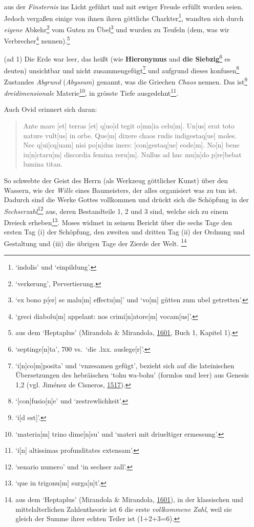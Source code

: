 \documentclass[
]{article}
\begin{document}
aus der \emph{Finsternis} ins Licht geführt und mit ewiger Freude
erfüllt worden seien. Jedoch vergaßen einige von ihnen ihren göttliche
Charkter\footnote{`indolis' und `einpildung'.}, wandten sich durch
\emph{eigene} Abkehr\footnote{`verkerung', Pervertierung.} vom Guten zu
Übel\footnote{`ex bono p{[}er{]} se malu{[}m{]} effectu{[}m{]}' und
  `vo{[}m{]} gůtten zum ubel getretten'.} und wurden zu Teufeln (dem, was wir
Verbrecher\footnote{`greci diabolu{[}m{]} appelant: nos
  crimi{[}n{]}atore{[}m{]} vocam{[}us{]}'.} nennen).\footnote{aus dem
  `Heptaplus' (Mirandola \& Mirandola,
  \href{https://doi.org/10.3931/e-rara-61217}{1601}, Buch 1, Kapitel 1).}

(ad 1) Die Erde war leer, das heißt (wie \textbf{Hieronymus} und
\textbf{die Siebzig}\footnote{`septinge{[}n{]}ta', 700 vs.~`die .lxx.
  auslege{[}r{]}'.} es deuten) unsichtbar und nicht
zusammengefügt\footnote{`i{[}n{]}co{[}m{]}posita' und `vnzesamen
  gefügt', bezieht sich auf die lateinischen Übersetzungen des
  hebräischen `tohu wa-bohu' (formlos und leer) aus Genesis 1,2 (vgl.
  Jiménez de Cisneros,
  \href{https://doi.org/10.3931/e-rara-46695}{1517}).} und aufgrund
dieses konfusen\footnote{`{[}con{]}fusio{[}n{]}e' und `zestrewlichkeit'.}
Zustandes \emph{Abgrund} (\emph{Abyssum}) genannt, was die Griechen
\emph{Chaos} nennen. Das ist\footnote{`i{[}d est{]}'.}
\emph{dreidimensionale} Materie\footnote{`materia{[}m{]} trino
  dime{[}n{]}su' und `materi mit driueltiger ermessung'.}, in grösste
Tiefe ausgedehnt\footnote{`i{[}n{]} altissimas profunditates extensam'.}.

Auch Ovid erinnert sich daran:

\begin{quote}
Ante mare {[}et{]} terras {[}et{]} q{[}uo{]}d tegit o{[}mn{]}ia
celu{[}m{]}. Un{[}us{]} erat toto nature vult{[}us{]} in orbe.
Que{[}m{]} dixere chaos rudis indigestaq{[}ue{]} moles. Nec
q{[}ui{]}cq{[}uam{]} nisi po{[}n{]}dus iners: {[}con{]}gestaq{[}ue{]}
eode{[}m{]}. No{[}n{]} bene iu{[}n{]}ctaru{[}m{]} discordia femina
reru{[}m{]}. Nullus ad huc mu{[}n{]}do p{[}re{]}bebat lumina titan.
\end{quote}

So schwebte der Geist des Herrn (als Werkzeug göttlicher Kunst) über den
Wassern, wie der \emph{Wille} eines Baumeisters, der alles organisiert
was zu tun ist. Dadurch sind die Werke Gottes vollkommen und drückt sich
die Schöpfung in der \emph{Sechserzahl}\footnote{`senario numero' und
  `in sechser zall'.} aus, deren Bestandteile 1, 2 und 3 sind, welche
sich zu einem Dreieck erheben\footnote{`que in trigonu{[}m{]}
  surga{[}n{]}t'.}. Moses widmet in seinem Bericht über die sechs Tage
den ersten Tag (i) der Schöpfung, den zweiten und dritten Tag (ii) der
Ordnung und Gestaltung und (iii) die übrigen Tage der Zierde der Welt.
\footnote{aus dem `Heptaplus' (Mirandola \& Mirandola,
  \href{https://doi.org/10.3931/e-rara-61217}{1601}), in der klassischen
  und mittelalterlichen Zahlentheorie ist 6 die erste \emph{vollkommene
  Zahl}, weil sie gleich der Summe ihrer echten Teiler ist (1+2+3=6).}
\end{document}
